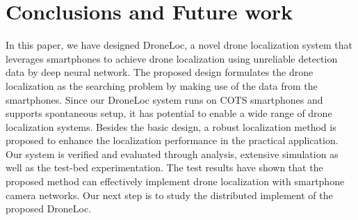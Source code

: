 
\section{Conclusions and Future work}

In this paper, we have designed DroneLoc, a novel drone localization system that leverages  smartphones to achieve drone localization using unreliable detection data by deep neural network.
The proposed design formulates the drone localization as the searching problem  by making use of the data from the smartphones.
Since our DroneLoc system runs on COTS smartphones and supports spontaneous setup, it has potential to enable a wide range of drone localization systems.
Besides the basic design, a robust localization method is proposed to enhance the localization performance in the practical application.
Our system is verified and evaluated through analysis, extensive simulation as well as the test-bed experimentation.
The test results have shown that the proposed method can effectively implement drone localization with smartphone camera networks.
Our next step is to study the distributed implement of the proposed DroneLoc.



